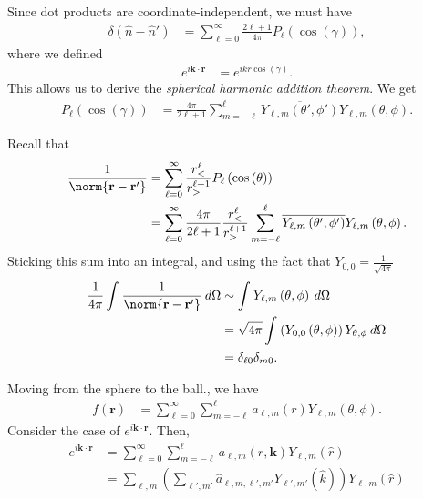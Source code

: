 \documentclass[10pt]{mypackage}
\begin{document}
\begin{example}
    Since dot products are coordinate-independent, we must have
    \begin{align*}
      \delta\left( \hat{n}-\hat{n}' \right) &= \sum_{\ell=0}^{\infty}\frac{2\ell + 1}{4\pi} P_{\ell}\left( \cos\left( \gamma \right) \right),
    \end{align*}
    where we defined
    \begin{align*}
      e^{i\mathbf{k}\cdot\mathbf{r}} &= e^{ikr\cos\left( \gamma \right)}.
    \end{align*}
    This allows us to derive the \textit{spherical harmonic addition theorem}. We get
    \begin{align*}
      P_{\ell}\left( \cos\left( \gamma \right) \right) &= \frac{4\pi}{2\ell + 1}\sum_{m=-\ell}^{\ell} \overline{Y_{\ell,m}\left( \theta',\phi' \right)}Y_{\ell,m}\left( \theta,\phi \right).
    \end{align*}
  \end{example}
  \begin{example}
    Recall that
    \begin{align*}
      \frac{1}{\norm{\mathbf{r} - \mathbf{r}'}} &= \sum_{\ell=0}^{\infty} \frac{r^{\ell}_{<}}{r^{\ell + 1}_{>}} P_{\ell}\left( \cos\left( \theta \right) \right)\\
                                                                &= \sum_{\ell=0}^{\infty}\frac{4\pi}{2\ell + 1} \frac{r^{\ell}_{<}}{r^{\ell + 1}_{>}}\sum_{m=-\ell}^{\ell} \overline{Y_{\ell,m}\left( \theta',\phi' \right)} Y_{\ell,m}\left( \theta,\phi \right).
    \end{align*}
    Sticking this sum into an integral, and using the fact that $Y_{0,0} = \frac{1}{\sqrt{4\pi}}$
    \begin{align*}
      \frac{1}{4\pi} \int_{}^{} \frac{1}{\norm{\mathbf{r} - \mathbf{r}'}}\:d\Omega &\sim \int_{}^{} Y_{\ell,m}\left( \theta,\phi \right)\:d\Omega\\
                                                                                   &= \sqrt{4\pi} \int_{}^{} \left( Y_{0,0} \left( \theta,\phi \right) \right) Y_{\theta,\phi}\:d\Omega\\
                                                                                   &= \delta_{\ell 0}\delta_{m 0}.
    \end{align*}
  \end{example}
  Moving from the sphere to the ball., we have
  \begin{align*}
    f\left( \mathbf{r} \right) &= \sum_{\ell=0}^{\infty}\sum_{m=-\ell}^{\ell}a_{\ell,m}\left( r \right)Y_{\ell,m}\left( \theta,\phi \right).
  \end{align*}
  Consider the case of $e^{i\mathbf{k}\cdot \mathbf{r}}$. Then,
  \begin{align*}
    e^{i\mathbf{k}\cdot \mathbf{r}} &= \sum_{\ell=0}^{\infty}\sum_{m=-\ell}^{\ell} a_{\ell,m}\left( r,\mathbf{k} \right) Y_{\ell,m}\left( \hat{r} \right)\\
                                    &= \sum_{\ell,m} \left( \sum_{\ell',m'} \hat{a}_{\ell,m,\ell',m'} Y_{\ell',m'}\left( \hat{k} \right) \right)Y_{\ell,m}\left( \hat{r} \right)
  \end{align*}
  
\end{document}
